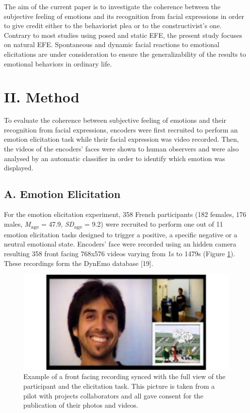 \documentclass[conference,final,]{IEEEtran}
\makeatletter
\def\maxwidth{\ifdim\Gin@nat@width>\linewidth\linewidth
\else\Gin@nat@width\fi}
\let\Oldincludegraphics\includegraphics
\renewcommand{\includegraphics}[1]{\Oldincludegraphics[width=\maxwidth]{#1}}
\makeatother
\begin{document}
The aim of the current paper is to investigate the coherence between the
subjective feeling of emotions and its recognition from facial
expressions in order to give credit either to the behaviorist plea or to
the constructivist's one. Contrary to most studies using posed and
static EFE, the present study focuses on natural EFE. Spontaneous and
dynamic facial reactions to emotional elicitations are under
consideration to ensure the generalizability of the results to emotional
behaviors in ordinary life.

\hypertarget{ii.-method}{%
\section{II. Method}\label{ii.-method}}

To evaluate the coherence between subjective feeling of emotions and
their recognition from facial expressions, encoders were first recruited
to perform an emotion elicitation task while their facial expression was
video recorded. Then, the videos of the encoders' faces were shown to
human observers and were also analysed by an automatic classifier in
order to identify which emotion was displayed.

\hypertarget{a.-emotion-elicitation}{%
\subsection{A. Emotion Elicitation}\label{a.-emotion-elicitation}}

For the emotion elicitation experiment, 358 French participants (182
females, 176 males, \emph{M}\textsubscript{age} = 47.9,
\emph{SD}\textsubscript{age} = 9.2) were recruited to perform one out of
11 emotion elicitation tasks designed to trigger a positive, a specific
negative or a neutral emotional state. Encoders' face were recorded
using an hidden camera resulting 358 front facing 768x576 videos varying
from 1s to 1479s (Figure \ref{fig:dynemo_img}). These recordings form
the DynEmo database {[}19{]}.

\begin{figure}
\centering
\includegraphics{ACII_2019_paper_files/figure-latex/dynemo_img-1.pdf}
\caption{\label{fig:dynemo_img}Example of a front facing recording
synced with the full view of the participant and the elicitation task.
This picture is taken from a pilot with projects collaborators and all
gave consent for the publication of their photos and videos.}
\end{figure}
\end{document}
